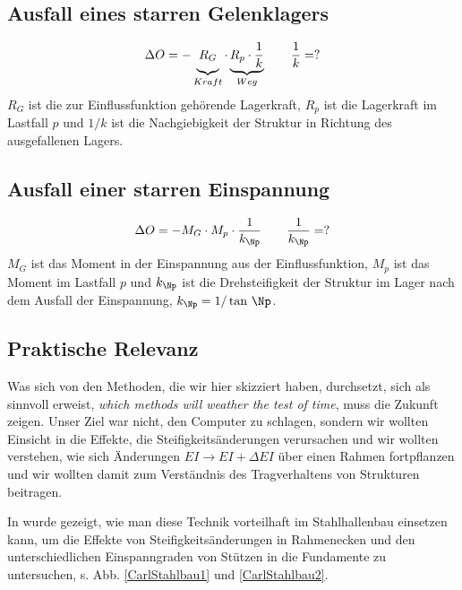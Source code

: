 {{{{{%
\textcolor{blau2}{\subsection{Ausfall eines starren Gelenklagers}}
\vspace{-0.7cm}
\begin{align}
\Delta O = - \underbrace{R_G\vphantom{\frac{1}{k}}}_{Kraft} \cdot \underbrace{R_p \cdot \frac{1}{k}}_{Weg} \qquad \frac{1}{k} = ?
\end{align}
$R_G$ ist die zur Einflussfunktion geh\"{o}rende Lagerkraft, $R_p$ ist die Lagerkraft im Lastfall $p$ und $1/k$ ist die Nachgiebigkeit der Struktur in Richtung des ausgefallenen Lagers.

\textcolor{blau2}{\subsection{Ausfall einer starren Einspannung}}
\vspace{-0.7cm}
\begin{align}
\Delta O = - M_G \cdot M_p \cdot \frac{1}{k_\Np}\qquad \frac{1}{k_\Np} = ?
\end{align}
$M_G$ ist das Moment in der Einspannung aus der Einflussfunktion, $M_p$ ist das Moment im Lastfall $p$ und $k_{\Np}$ ist die Drehsteifigkeit der Struktur im Lager nach dem Ausfall der Einspannung, $k_\Np = 1/\tan\,\Np$.


\textcolor{blau2}{\section{Praktische Relevanz}}

Was sich von den Methoden, die wir hier skizziert haben, durchsetzt, sich als sinnvoll erweist, {\em which methods will weather the test of time\/}, muss die Zukunft zeigen. Unser Ziel war nicht,  den Computer zu schlagen, sondern wir wollten Einsicht in die Effekte, die Steifigkeits\"{a}nderungen verursachen und wir wollten verstehen, wie sich \"{A}nderungen $EI \to EI + \Delta EI$ \"{u}ber einen Rahmen fortpflanzen und wir wollten damit zum Verst\"{a}ndnis des Tragverhaltens von Strukturen beitragen.

In \cite{Carl4} wurde gezeigt, wie man diese Technik vorteilhaft im Stahlhallenbau einsetzen kann, um die Effekte von Steifigkeits\"{a}nderungen in Rahmenecken und den unterschiedlichen Einspanngraden von St\"{u}tzen in die Fundamente zu untersuchen, s. Abb. \ref{CarlStahlbau1} und \ref{CarlStahlbau2}.\\

}}}}}
